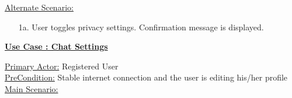 \documentclass[conference,compsoc]{IEEEtran}
\newcounter{UC}
\newcommand{\nextU}{\stepcounter{UC}\theUC}
\begin{document}
\underline{Alternate Scenario:}\\
\begin{enumerate}
    \item [1a.] User toggles privacy settings. Confirmation message is displayed.
\end{enumerate}\vspace{0.2cm}

\underline{\textbf{Use Case \nextU: Chat Settings}}
\vspace{0.2cm}

\underline{Primary Actor:} Registered User\\

\underline{PreCondition:} Stable internet connection and the user is editing his/her profile\\

\underline{Main Scenario:}\\
\end{document}
